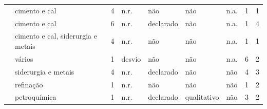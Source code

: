 {\begin{xltabular}{\linewidth}{@{}>{\raggedright\arraybackslash}X>{\raggedright\arraybackslash}p{2.3cm}rllllrr@{}}
\textcite{Ottermann2011} & cimento e cal & 4 & n.r. & não & não & n.a. & 1 & 1 \\
\textcite{Pelser2018} & cimento e cal & 6 & n.r. & declarado & não & n.a. & 1 & 4 \\
\textcite{Scripcariu2021} & cimento e cal, siderurgia e metais & 4 & n.r. & não & não & n.a. & 1 & 1 \\
\textcite{Sivill2013} & vários & 1 & desvio & não & não & n.a. & 6 & 2 \\
\textcite{Tarasovskii2014} & siderurgia e metais & 4 & n.r. & declarado & não & não & 4 & 3 \\
\textcite{Velazquez2013} & refinação & 1 & n.r. & não & não & não & 1 & 2 \\
\textcite{Yao2016} & petroquímica & 1 & n.r. & declarado & qualitativo & não & 3 & 2 \\
\end{xltabular}
}
